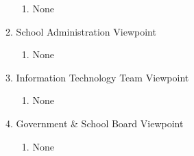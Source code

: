 \documentclass[]{article}
\begin{document}
\begin{enumerate}[{BE}1.]
\begin{enumerate}[{VP1}.1]
\begin{enumerate}
				\item None
			\end{enumerate}
		\item School Administration Viewpoint
			\begin{enumerate}
				\item None
			\end{enumerate}
		\item Information Technology Team Viewpoint
			\begin{enumerate}
				\item None
			\end{enumerate}
		\item Government \& School Board Viewpoint
			\begin{enumerate}
				\item None
			\end{enumerate}
	\end{enumerate}


\end{enumerate}
\end{document}
